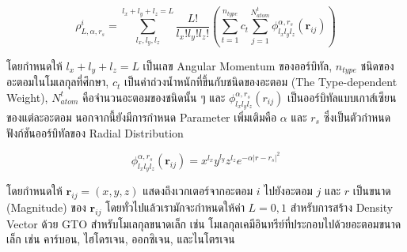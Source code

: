 \begin{equation}
    \rho^{i}_{L,\alpha,r_{s}} = \sum^{l_{x}+l_{y}+l_{z} = L}_{l_{x},l_{y},l_{z}} 
    \frac{L!}{l_{x}!l_{y}!l_{z}!} \left ( \sum^{n_{type}}_{t=1} c_{t} \sum^{N^{t}_{atom}}_{j=1} 
    \phi^{\alpha,r_{s}}_{l_{x}l_{y}l_{z}} (\boldsymbol{r}_{ij}) \right )
\end{equation}

\noindent โดยกำหนดให้ $l_{x}+l_{y}+l_{z} = L$ เป็นเลข Angular Momentum ของออร์บิทัล, $n_{type}$ ชนิดของอะตอมในโมเลกุลที่ศึกษา, 
$c_{t}$ เป็นค่าถ่วงน้ำหนักที่ขึ้นกับชนิดของอะตอม (The Type-dependent Weight), $N^{t}_{atom}$ คือจำนวนอะตอมของชนิดนั้น ๆ
และ $\phi^{\alpha,r_{s}}_{l_{x}l_{y}l_{z}} (r_{ij})$ เป็นออร์บิทัลแบบเกาส์เซียนของแต่ละอะตอม นอกจากนี้ยังมีการกำหนด 
Parameter เพิ่มเติมคือ $\alpha$ และ $r_{s}$ ซึ่งเป็นตัวกำหนดฟังก์ชันออร์บิทัลของ Radial Distribution

\begin{equation}
    \phi^{\alpha,r_{s}}_{l_{x}l_{y}l_{z}} (\boldsymbol{r}_{ij}) = x^{l_{x}}y^{l_{y}}z^{l_{z}} e^{-\alpha 
    |r-r_{s}|^{2}}
\end{equation}

\noindent โดยกำหนดให้ $\boldsymbol{r}_{ij} = (x,y,z)$ แสดงถึงเวกเตอร์จากอะตอม $i$ ไปยังอะตอม $j$ และ $r$ 
เป็นขนาด (Magnitude) ของ $\boldsymbol{r}_{ij}$ โดยทั่วไปแล้วเรามักจะกำหนดให้ค่า $L=0,1$ สำหรับการสร้าง Density Vector ด้วย GTO
สำหรับโมเลกุลขนาดเล็ก เช่น โมเลกุลเคมีอินทรีย์ที่ประกอบไปด้วยอะตอมขนาดเล็ก เช่น คาร์บอน, ไฮโดรเจน, ออกซิเจน, และไนโตรเจน\cite{kwac2021}
